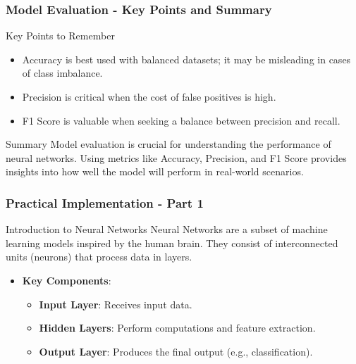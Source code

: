 \documentclass[aspectratio=169]{beamer}
\begin{document}
\begin{frame}[fragile]
    \frametitle{Model Evaluation - Key Points and Summary}
    \begin{block}{Key Points to Remember}
        \begin{itemize}
            \item Accuracy is best used with balanced datasets; it may be misleading in cases of class imbalance.
            \item Precision is critical when the cost of false positives is high.
            \item F1 Score is valuable when seeking a balance between precision and recall.
        \end{itemize}
    \end{block}
    \begin{block}{Summary}
        Model evaluation is crucial for understanding the performance of neural networks. Using metrics like Accuracy, Precision, and F1 Score provides insights into how well the model will perform in real-world scenarios.
    \end{block}
\end{frame}

\begin{frame}[fragile]
    \frametitle{Practical Implementation - Part 1}
    \begin{block}{Introduction to Neural Networks}
        Neural Networks are a subset of machine learning models inspired by the human brain. They consist of interconnected units (neurons) that process data in layers.
    \end{block}

    \begin{itemize}
        \item \textbf{Key Components}:
        \begin{itemize}
            \item \textbf{Input Layer}: Receives input data.
            \item \textbf{Hidden Layers}: Perform computations and feature extraction.
            \item \textbf{Output Layer}: Produces the final output (e.g., classification).
        \end{itemize}
    \end{itemize}
\end{frame}
\end{document}
